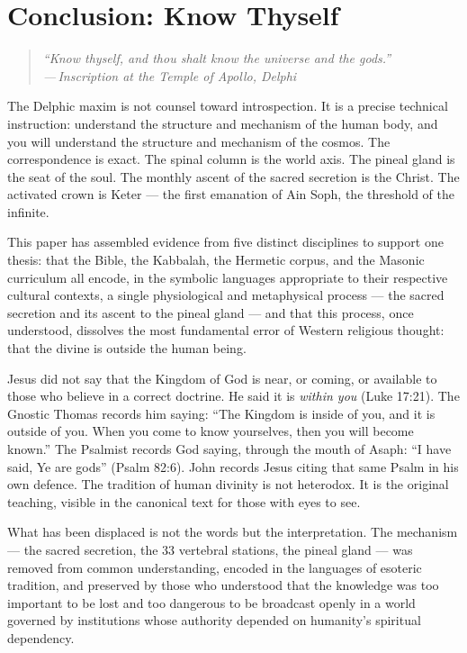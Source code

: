 \documentclass[12pt, a4paper]{article}
\newcommand{\epigraph}[2]{%
  \begin{quote}
    \itshape ``#1''\\[0.3em]
    \normalfont\small\hfill ---\,#2
  \end{quote}
}
\begin{document}
\section{Conclusion: Know Thyself}
\label{sec:conclusion}

\epigraph{Know thyself, and thou shalt know the universe and the gods.}{Inscription
at the Temple of Apollo, Delphi}

The Delphic maxim is not counsel toward introspection. It is a precise
technical instruction: understand the structure and mechanism of the human
body, and you will understand the structure and mechanism of the cosmos. The
correspondence is exact. The spinal column is the world axis. The pineal gland
is the seat of the soul. The monthly ascent of the sacred secretion is the
Christ. The activated crown is Keter — the first emanation of Ain Soph, the
threshold of the infinite.

This paper has assembled evidence from five distinct disciplines to support
one thesis: that the Bible, the Kabbalah, the Hermetic corpus, and the
Masonic curriculum all encode, in the symbolic languages appropriate to their
respective cultural contexts, a single physiological and metaphysical process
— the sacred secretion and its ascent to the pineal gland — and that this
process, once understood, dissolves the most fundamental error of Western
religious thought: that the divine is outside the human being.

Jesus did not say that the Kingdom of God is near, or coming, or available to
those who believe in a correct doctrine. He said it is \emph{within you}
(Luke 17:21). The Gnostic Thomas records him saying: ``The Kingdom is inside
of you, and it is outside of you. When you come to know yourselves, then you
will become known.'' The Psalmist records God saying, through the mouth of
Asaph: ``I have said, Ye are gods'' (Psalm 82:6). John records Jesus citing
that same Psalm in his own defence. The tradition of human divinity is not
heterodox. It is the original teaching, visible in the canonical text for
those with eyes to see.

What has been displaced is not the words but the interpretation. The mechanism
— the sacred secretion, the 33 vertebral stations, the pineal gland — was
removed from common understanding, encoded in the languages of esoteric
tradition, and preserved by those who understood that the knowledge was too
important to be lost and too dangerous to be broadcast openly in a world
governed by institutions whose authority depended on humanity's spiritual
dependency.
\end{document}
